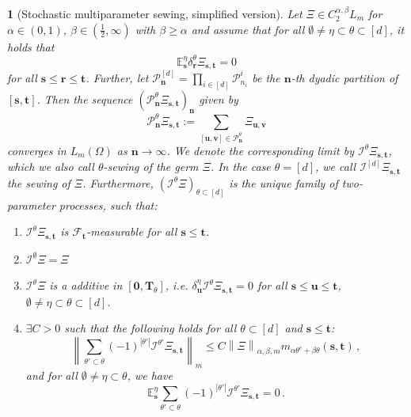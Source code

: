 \documentclass[11pt,oneside,english,reqno]{amsart}
\numberwithin{equation}{section}
\numberwithin{figure}{section}
\theoremstyle{plain}
\theoremstyle{definition}
\theoremstyle{remark}
\theoremstyle{plain}
\newtheorem{lem}[thm]{\protect\lemmaname}
\theoremstyle{plain}
\theoremstyle{plain}
\theoremstyle{plain}
\theoremstyle{plain}
\providecommand{\lemmaname}{Lemma}
\newcommand{\cF}{\mathcal{F}}
\newcommand{\cI}{\mathcal{I}}
\newcommand{\cP}{\mathcal{P}}
\newcommand{\EE}{\mathbb{E}}
\newcommand{\bn}{\mathbf{n}}
\newcommand{\br}{\mathbf{r}}
\newcommand{\bT}{\mathbf{T}}
\newcommand{\boo}{\mathbf{0}}
\newcommand{\bu}{\mathbf{u}}
\newcommand{\bv}{\mathbf{v}}
\newcommand{\bs}{\mathbf{s}}
\newcommand{\bt}{\mathbf{t}}
\newcommand{\norm}[1]{\left\lVert #1\right\rVert}
\newcommand{\abs}[1]{\left\lvert #1\right\rvert}
\begin{document}
\begin{lem}[Stochastic multiparameter sewing, simplified version]\label{lem:stochastic sewing simplified}
    Let $\Xi\in C_2^{\alpha,\beta}L_m$ for $\alpha\in(0,1)$, $\beta\in(\frac 12,\infty)$ with $\beta\geq\alpha$ and assume that for all $\emptyset\neq\eta\subset\theta\subset[d]$, it holds that
%
    \begin{equation}
        \EE^\eta_\bs\delta^\theta_\br\Xi_{\bs,\bt} = 0\label{eq:expDelta=0}
    \end{equation}
%
    for all $\bs\le\br\le\bt$. Further, let $\cP_\bn^{[d]} = \prod_{i\in[d]} \cP^i_{n_i}$ be the $\bn$-th dyadic partition of $[\bs,\bt]$. Then the sequence $(\cP^\theta_\bn\Xi_{\bs,\bt})_\bn$ given by 
%
    \begin{equation*}
     \cP^\theta_\bn\Xi_{\bs,\bt}:=\sum_{[\bu,\bv]\in\cP^\theta_\bn}\Xi_{\bu,\bv}
    \end{equation*}
%
    converges in $L_m(\Omega)$ as $\bn\to \infty$. We denote the corresponding limit by $ \cI^\theta\Xi_{\bs,\bt}$, which we also call $\theta$-sewing of the germ $\Xi$. In the case $\theta=[d]$, we call $\mathcal{I}^{[d]}\Xi_{\bs, \bt}$ the sewing of $\Xi$.  Furthermore, $(\cI^\theta\Xi)_{\theta\subset[d]}$ is the unique family of two-parameter processes, such that:
%
    \begin{enumerate}[label = (\roman*)]
        \item $\cI^\theta \Xi_{\bs,\bt}$ is $\cF_\bt$-measurable for all $\bs\le\bt$.
        \item $\cI^\emptyset\Xi = \Xi$
        \item $\cI^\theta\Xi$ is a additive in $[\boo,\bT_\theta]$, i.e. $\delta^\eta_\bu\cI^\theta\Xi_{\bs,\bt} = 0$ for all $\bs\le\bu\le\bt$, $\emptyset\neq\eta\subset\theta\subset[d]$.
        \item $\exists C>0$ such that the following holds for all $\theta\subset[d]$ and $\bs\le\bt$:
%
        \begin{equation}
            \norm{\sum_{\theta'\subset\theta} (-1)^{\abs {\theta'}}\cI^{\theta'}\Xi_{\bs,\bt}}_m \le C\norm{\Xi}_{\alpha,\beta,m}m_{\alpha\theta^c+\beta\theta}(\bs,\bt)\,,\label{eq:UniquePropertySimplified1}
        \end{equation}
%
        and for all $\emptyset\neq\eta\subset\theta$, we have
%
        \begin{equation}
            \EE^\eta_\bs\sum_{\theta'\subset\theta} (-1)^{\abs{\theta'}}\cI^{\theta'}\Xi_{\bs,\bt} = 0\,.\label{eq:UniquePropertySimplified2}
        \end{equation}
    \end{enumerate}
\end{lem}
\end{document}
